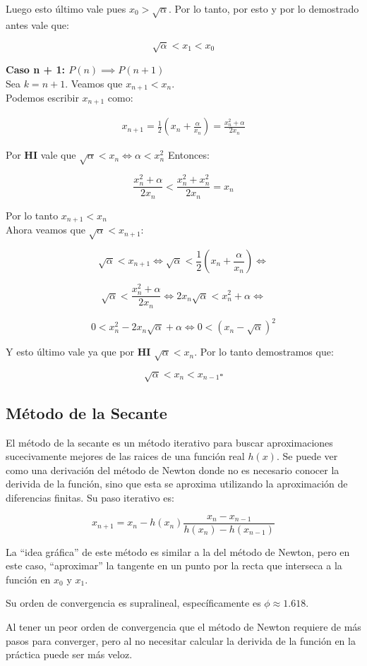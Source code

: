 Luego esto último vale pues $x_0 > \sqrt{\alpha}$. Por lo tanto, por esto y por lo demostrado antes vale que:

\[
    \sqrt{\alpha} < x_1 < x_0
\]

{\bf Caso n + 1: $P(n) \implies P(n + 1)$}\\

Sea $k = n + 1$. Veamos que $x_{n + 1} < x_n$.\\

Podemos escribir $x_{n + 1}$ como:

\begin{align*}
    x_{n + 1} = \frac{ 1 }{ 2 }(x_n + \frac{ \alpha }{ x_n }) = \frac{ x_n^2 + \alpha }{ 2x_n }
\end{align*}

Por {\bf HI} vale que $\sqrt{\alpha} < x_n \iff \alpha < x_n^2 $ Entonces:

\[
    \frac{ x_n^2 + \alpha } {2x_n } < \frac{ x_n^2 + x_n^2 }{ 2x_n } = x_n
\]

Por lo tanto $x_{n + 1} < x_n$ \\

Ahora veamos que $\sqrt{\alpha} < x_{n + 1}$:

\[
    \sqrt{\alpha} < x_{n + 1} \iff \sqrt{\alpha} < \frac{1}{2}(x_n + \frac{\alpha}{x_n}) \iff
\]

\[
     \sqrt{\alpha} < \frac{x_n^2 + \alpha}{2x_n} \iff 2x_n\sqrt{\alpha} < x_n^2 + \alpha \iff
\]

\[
     0 < x_n^2 - 2x_n\sqrt{\alpha} + \alpha \iff 0 < {(x_n - \sqrt{\alpha})}^2
\]

Y esto último vale ya que por {\bf HI} $\sqrt{\alpha} < x_n$. Por lo tanto demostramos que:

\[
    \sqrt{\alpha} < x_n < x_{n - 1} \square
\]

\subsection{Método de la Secante}

El método de la secante es un método iterativo para buscar aproximaciones
sucecivamente mejores de las raices de una función real $h(x)$. Se puede ver
como una derivación del método de Newton donde no es necesario conocer la
derivida de la función, sino que esta se aproxima utilizando la aproximación de
diferencias finitas. Su paso iterativo es:

\begin{equation}\label{secante}
    x_{n + 1} = x_n - h(x_n) \frac{ x_n - x_{n - 1} }{ h(x_n) - h(x_{n - 1}) }
\end{equation}

La ``idea gráfica'' de este método es similar a la del método de Newton, pero en
este caso, ``aproximar'' la tangente en un punto por la recta que interseca a la
función en $x_0$ y $x_1$.

Su orden de convergencia es supralineal, específicamente es $\phi \approx
1.618$.

Al tener un peor orden de convergencia que el método de Newton requiere de más
pasos para converger, pero al no necesitar calcular la derivida de la función
en la práctica puede ser más veloz.
